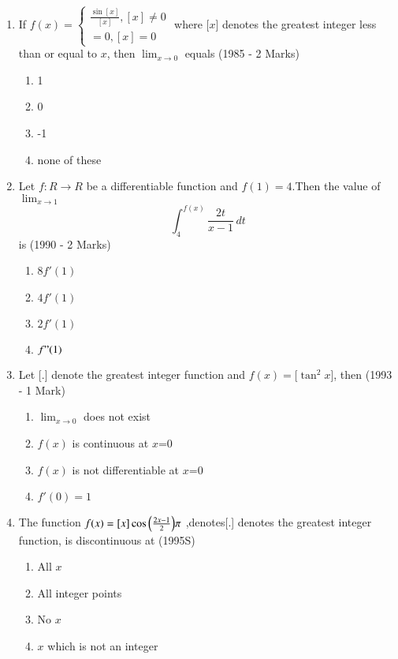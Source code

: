 \documentclass[journal,12pt,twocolumn]{IEEEtran}
\theoremstyle{remark}
\begin{document}
\begin{enumerate}[start=2]
\begin{enumerate}
                 \end{enumerate}

\item If $f(x)=\begin{cases}
    \frac{\sin[x]}{[x]}, [x]\neq 0\\ =0 ,  [x]=0\end{cases}$   where [$x$] denotes the greatest integer less than or equal to $x$, then $\lim_{x\to 0}$ equals
    \hfill                (1985 - 2 Marks)
    \begin{enumerate}
        \item 1
        \item 0
        \item -1
        \item none of these
    \end{enumerate}

\item Let $f:R\to R$ be a differentiable function and $f(1)=4$.Then the value of $\lim_{x\to 1}$\[ \int_{4}^{f(x)}\frac{2t}{x-1}\,dt\]  is
\hfill(1990 - 2 Marks)
 \begin{enumerate}
     \item 8$f'(1)$
     \item $4f'(1)$
     \item $2f'(1)$
     \item $f"(1)$
     
     
 \end{enumerate}

\item Let [.] denote the greatest integer function and $f(x)=[\tan^2{x}$], then
\hfill(1993 - 1 Mark)
    \begin{enumerate}
        \item $\lim_{x\to 0}$ does not exist
        \item $f(x)$ is continuous at $x$=0
        \item $f(x)$ is not differentiable at $x$=0
        \item $f'(0)=1$
        
    \end{enumerate}

\item The function $f(x)=[x]\cos{\ensuremath{\left(\frac{2x-1}{2}\right)}}\pi$ ,denotes[.] denotes the greatest integer function, is discontinuous at
\hfill(1995S)
   \begin{enumerate}
       \item All $x$
       \item All integer points
       \item No $x$
       \item $x$ which is not an integer
   \end{enumerate}


\end{enumerate}
\end{document}
